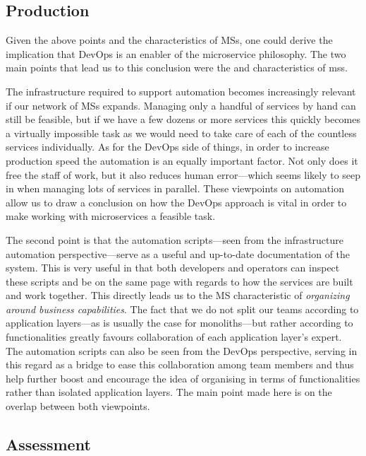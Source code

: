 \subsection{Production}

Given the above points and the characteristics of MSs, one
could derive the implication that DevOps is an enabler
of the microservice philosophy. The two main points that lead
us to this conclusion were the  and
 characteristics of \glspl{ms}.

The infrastructure required to support automation becomes increasingly relevant if our
network of MSs expands. Managing only a handful of services by hand
can still be feasible, but if we have a few dozens or more services
this quickly becomes a virtually impossible task as we would need to
take care of each of the countless services individually. As for the
DevOps side of things, in order to increase production speed the
automation is an equally important factor. Not only does it free the
staff of work, but it also reduces human error---which seems likely to
seep in when managing lots of services in parallel. These viewpoints
on automation allow us to draw a conclusion on how the DevOps
approach is vital in order to make working with microservices a
feasible task.

The second point is that the automation scripts---seen from the
infrastructure automation perspective---serve as a useful and up-to-date
documentation of the system. This is very useful in that both
developers and operators can inspect these scripts and be on the same
page with regards to how the services are built and work together.
This directly leads us to the MS characteristic of \textit{organizing
around business capabilities}. The fact that we do not split our teams
according to application layers---as is usually the case for
monoliths---but rather according to functionalities greatly favours
collaboration of each application layer's expert. The automation
scripts can also be seen from the DevOps perspective, serving in this
regard as a bridge to ease this collaboration among team members and
thus help further boost and encourage the idea of organising in terms
of functionalities rather than isolated application layers. The main
point made here is on the overlap between both viewpoints.

\subsection{Assessment}

